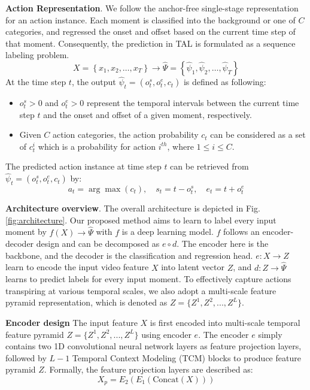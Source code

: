 \documentclass[10pt,twocolumn,letterpaper]{article}
\begin{document}
\textbf{Action Representation}. We follow the anchor-free single-stage representation \cite{lin2021learning, zhang2022actionformer} for an action instance. Each moment is classified into the background or one of $C$ categories, and regressed the onset and offset based on the current time step of that moment. Consequently, the prediction in TAL is formulated as a sequence labeling problem.
\begin{equation}
X=\left\{x_1, x_2, \ldots, x_T\right\} \rightarrow \hat{\Psi}=\left\{\hat{\psi}_1, \hat{\psi}_2, \ldots, \hat{\psi}_T\right\}
\end{equation}
At the time step $t$, the output $\hat{\psi}_t = (o_t^s, o_t^e, c_t)$ is defined as following:
\begin{itemize}
\item $o_t^s > 0$ and $o_t^e > 0$ represent the temporal intervals between the current time step $t$ and the onset and offset of a given moment, respectively.
\item Given $C$ action categories, the action probability $c_t$ can be considered as a set of $c_t^i$ which is a probability for action $i^{th}$, where $1\leq i \leq C$.
\end{itemize}
The predicted action instance at time step $t$ can be retrieved from $\hat{\psi}_t = (o_t^s, o_t^e, c_t)$ by:
\begin{equation}
a_t=\arg \max \left(c_t\right), \quad s_t=t-o_t^s, \quad e_t=t+o_t^e
\end{equation}

\textbf{Architecture overview}. The overall architecture is depicted in Fig. \ref{fig:architecture}. Our proposed method aims to learn to label every input moment by $f\left(X\right) \rightarrow \hat{\Psi}$ with $f$ is a deep learning model. $f$ follows an encoder-decoder design and can be decomposed as $e \circ d$. The encoder here is the backbone, and the decoder is the classification and regression head. $e: X \rightarrow Z$ learn to encode the input video feature $X$ into latent vector $Z$, and $d: Z \rightarrow \hat{\Psi}$ learns to predict labels for every input moment. To effectively capture actions transpiring at various temporal scales, we also adopt a multi-scale feature pyramid representation, which is denoted as $Z = \{Z^1, Z^2, . . . , Z^L\}$.



\textbf{Encoder design}
The input feature $X$ is first encoded into multi-scale temporal feature pyramid $Z = \{Z^1, Z^2, . . . , Z^L\}$ using encoder $e$. The encoder $e$ simply contains two 1D convolutional neural network layers as feature projection layers, followed by $L-1$ Temporal Context Modeling (TCM) blocks to produce feature pyramid $Z$. Formally, the feature projection layers are described as:
\begin{equation} \label{eq:projection}
X_{p} = E_2(E_1(\text{Concat}(X)))
\end{equation}
\end{document}
